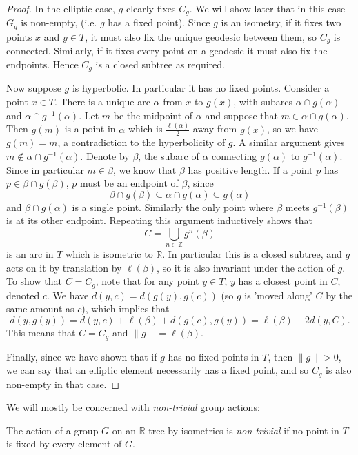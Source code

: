 \begin{proof}
    In the elliptic case, $g$ clearly fixes $C_g$. We will show later that in this case $G_g$ is non-empty, (i.e. $g$ has a fixed point). Since $g$ is an isometry, if it fixes two points $x$ and $y\in T$, it must also fix the unique geodesic between them, so $C_g$ is connected. Similarly, if it fixes every point on a geodesic it must also fix the endpoints. Hence $C_g$ is a closed subtree as required.

    Now suppose $g$ is hyperbolic. In particular it has no fixed points. Consider a point $x\in T$. There is a unique arc $\alpha$ from $x$ to $g(x)$, with subarcs $\alpha \cap g(\alpha)$ and $\alpha \cap g^{-1}(\alpha)$. Let $m$ be the midpoint of $\alpha$ and suppose that $m\in \alpha \cap g(\alpha)$. Then $g(m)$ is a point in $\alpha$ which is $\frac{\ell(\alpha)}{2}$ away from $g(x)$, so we have $g(m)=m$, a contradiction to the hyperbolicity of $g$. A similar argument gives $m\notin \alpha \cap g^{-1}(\alpha)$. Denote by $\beta$, the subarc of $\alpha$ connecting $g(\alpha)$ to $g^{-1}(\alpha)$. Since in particular $m\in \beta$, we know that $\beta$ has positive length. If a point $p$ has $p\in \beta \cap g(\beta)$, $p$ must be an endpoint of $\beta$, since \[\beta\cap g(\beta)\subseteq\alpha\cap g(\alpha)\subseteq g(\alpha)\] and $\beta\cap g(\alpha)$ is a single point. Similarly the only point where $\beta$ meets $g^{-1}(\beta)$ is at its other endpoint. Repeating this argument inductively shows that \[C=\underset{n\in\mathbb{Z}}{\bigcup}g^n(\beta)\] is an arc in $T$ which is isometric to $\mathbb{R}$. In particular this is a closed subtree, and $g$ acts on it by translation by $\ell(\beta)$, so it is also invariant under the action of $g$. To show that $C=C_g$, note that for any point $y\in T$, $y$ has a closest point in $C$, denoted $c$. We have $d(y,c)=d(g(y),g(c))$ (so $g$ is 'moved along' $C$ by the same amount as $c$), which implies that \[d(y,g(y))=d(y,c)+\ell(\beta)+d(g(c),g(y))=\ell(\beta)+2d(y,C).\] This means that $C=C_g$ and $\lVert g\rVert=\ell(\beta)$.

    Finally, since we have shown that if $g$ has no fixed points in $T$, then $\lVert g\rVert>0$, we can say that an elliptic element necessarily has a fixed point, and so $C_g$ is also non-empty in that case.
\end{proof}

We will mostly be concerned with \textit{non-trivial} group actions:
\begin{definition}
    The action of a group $G$ on an $\mathbb{R}$-tree by isometries is \emph{non-trivial} if no point in $T$ is fixed by every element of $G$.
\end{definition}

